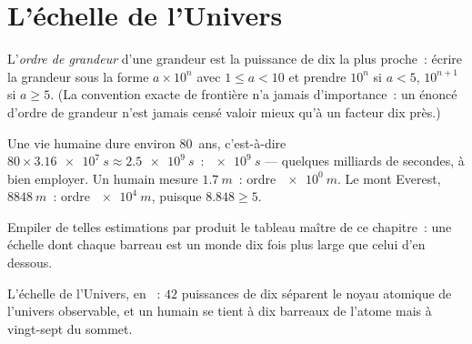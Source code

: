 \section{L'échelle de l'Univers}

\begin{definition}\label{def:g10:orders-of-magnitude:oom}
L'\emph{ordre de grandeur} d'une grandeur
est la puissance de dix la plus proche~: écrire la grandeur sous la
forme $a \times 10^{n}$ avec $1 \leq a < 10$ et prendre $10^{n}$ si
$a < 5$, $10^{n+1}$ si $a \geq 5$. (La convention exacte de frontière
n'a jamais d'importance~: un énoncé d'ordre de grandeur n'est jamais
censé valoir mieux qu'à un facteur dix près.)
\end{definition}

\begin{example}\label{ex:g10:orders-of-magnitude:oom}
Une vie humaine dure environ $80$~ans, c'est-à-dire
$80 \times \qty{3.16e7}{s} \approx \qty{2.5e9}{s}$~:  $\qty{e9}{s}$ --- quelques milliards de secondes, à bien
employer. Un humain mesure $\qty{1.7}{m}$~: ordre $\qty{e0}{m}$. Le
mont Everest, $\qty{8848}{m}$~: ordre $\qty{e4}{m}$, puisque
$8.848 \geq 5$.
\end{example}

Empiler de telles estimations par  produit le tableau
maître de ce chapitre~: une échelle dont chaque barreau est un monde
dix fois plus large que celui d'en dessous.

\begin{omfigure}

{\small L'échelle de l'Univers, en ~: $42$ puissances de dix
séparent le noyau atomique de l'univers observable, et un humain se
tient à dix barreaux de l'atome mais à vingt-sept du sommet.}
\end{omfigure}

